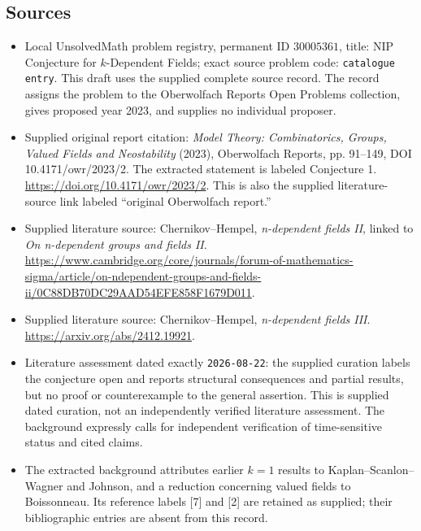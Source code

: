 \documentclass[11pt]{article}
\begin{document}
\subsection{Sources}
\begin{itemize}
\item Local UnsolvedMath problem registry, permanent ID \(30005361\), title: NIP Conjecture for \(k\)-Dependent Fields; exact source problem code: \texttt{catalogue entry}. This draft uses the supplied complete source record. The record assigns the problem to the Oberwolfach Reports Open Problems collection, gives proposed year 2023, and supplies no individual proposer.
\item Supplied original report citation: \emph{Model Theory: Combinatorics, Groups, Valued Fields and Neostability} (2023), Oberwolfach Reports, pp. 91--149, DOI 10.4171/owr/2023/2. The extracted statement is labeled Conjecture 1. \url{https://doi.org/10.4171/owr/2023/2}. This is also the supplied literature-source link labeled ``original Oberwolfach report.''
\item Supplied literature source: Chernikov--Hempel, \emph{n-dependent fields II}, linked to \emph{On n-dependent groups and fields II}. \url{https://www.cambridge.org/core/journals/forum-of-mathematics-sigma/article/on-ndependent-groups-and-fields-ii/0C88DB70DC29AAD54EFE858F1679D011}.
\item Supplied literature source: Chernikov--Hempel, \emph{n-dependent fields III}. \url{https://arxiv.org/abs/2412.19921}.
\item Literature assessment dated exactly \texttt{2026-08-22}: the supplied curation labels the conjecture open and reports structural consequences and partial results, but no proof or counterexample to the general assertion. This is supplied dated curation, not an independently verified literature assessment. The background expressly calls for independent verification of time-sensitive status and cited claims.
\item The extracted background attributes earlier \(k=1\) results to Kaplan--Scanlon--Wagner and Johnson, and a reduction concerning valued fields to Boissonneau. Its reference labels [7] and [2] are retained as supplied; their bibliographic entries are absent from this record.
\end{itemize}
\end{document}
